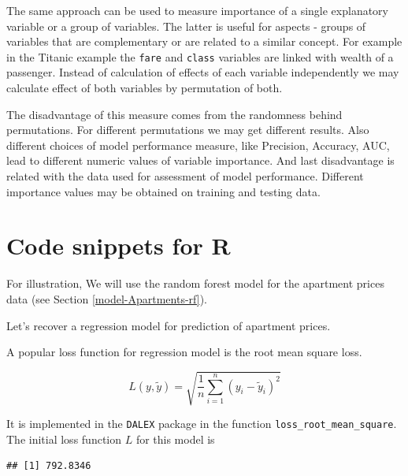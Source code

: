 \documentclass[]{krantz}
\newenvironment{Shaded}{\begin{snugshade}}{\end{snugshade}}
\newcommand{\KeywordTok}[1]{\textcolor[rgb]{0.13,0.29,0.53}{\textbf{#1}}}
\newcommand{\NormalTok}[1]{#1}
\newcommand{\OperatorTok}[1]{\textcolor[rgb]{0.81,0.36,0.00}{\textbf{#1}}}
\begin{document}
The same approach can be used to measure importance of a single explanatory variable or a group of variables. The latter is useful for aspects - groups of variables that are complementary or are related to a similar concept. For example in the Titanic example the \texttt{fare} and \texttt{class} variables are linked with wealth of a passenger. Instead of calculation of effects of each variable independently we may calculate effect of both variables by permutation of both.

The disadvantage of this measure comes from the randomness behind permutations. For different permutations we may get different results. Also different choices of model performance measure, like Precision, Accuracy, AUC, lead to different numeric values of variable importance. And last disadvantage is related with the data used for assessment of model performance. Different importance values may be obtained on training and testing data.

\hypertarget{featureImportanceR}{%
\section{Code snippets for R}\label{featureImportanceR}}

For illustration, We will use the random forest model for the apartment prices data (see Section \ref{model-Apartments-rf}).

Let's recover a regression model for prediction of apartment prices.

A popular loss function for regression model is the root mean square loss.

\[
  L(y, \tilde y) = \sqrt{\frac1n \sum_{i=1}^n (y_i - \tilde y_i)^2}
\]

It is implemented in the \texttt{DALEX} package in the function \texttt{loss\_root\_mean\_square}. The initial loss function \(L\) for this model is

\begin{Shaded}
\end{Shaded}

\begin{verbatim}
## [1] 792.8346
\end{verbatim}
\end{document}
